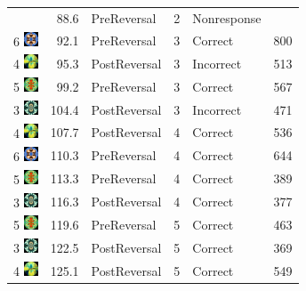 \documentclass[]{article}
\begin{document}
\begin{longtable}[]{@{}lrlrll@{}}
& 88.6 & PreReversal & 2 & Nonresponse &\tabularnewline
6
\includegraphics[width=0.16670in,height=0.16670in]{../ReversalLearning_20130621/images/abs6.jpg}
& 92.1 & PreReversal & 3 & Correct & 800\tabularnewline
4
\includegraphics[width=0.16670in,height=0.16670in]{../ReversalLearning_20130621/images/abs4.jpg}
& 95.3 & PostReversal & 3 & Incorrect & 513\tabularnewline
5
\includegraphics[width=0.16670in,height=0.16670in]{../ReversalLearning_20130621/images/abs5.jpg}
& 99.2 & PreReversal & 3 & Correct & 567\tabularnewline
3
\includegraphics[width=0.16670in,height=0.16670in]{../ReversalLearning_20130621/images/abs3.jpg}
& 104.4 & PostReversal & 3 & Incorrect & 471\tabularnewline
4
\includegraphics[width=0.16670in,height=0.16670in]{../ReversalLearning_20130621/images/abs4.jpg}
& 107.7 & PostReversal & 4 & Correct & 536\tabularnewline
6
\includegraphics[width=0.16670in,height=0.16670in]{../ReversalLearning_20130621/images/abs6.jpg}
& 110.3 & PreReversal & 4 & Correct & 644\tabularnewline
5
\includegraphics[width=0.16670in,height=0.16670in]{../ReversalLearning_20130621/images/abs5.jpg}
& 113.3 & PreReversal & 4 & Correct & 389\tabularnewline
3
\includegraphics[width=0.16670in,height=0.16670in]{../ReversalLearning_20130621/images/abs3.jpg}
& 116.3 & PostReversal & 4 & Correct & 377\tabularnewline
5
\includegraphics[width=0.16670in,height=0.16670in]{../ReversalLearning_20130621/images/abs5.jpg}
& 119.6 & PreReversal & 5 & Correct & 463\tabularnewline
3
\includegraphics[width=0.16670in,height=0.16670in]{../ReversalLearning_20130621/images/abs3.jpg}
& 122.5 & PostReversal & 5 & Correct & 369\tabularnewline
4
\includegraphics[width=0.16670in,height=0.16670in]{../ReversalLearning_20130621/images/abs4.jpg}
& 125.1 & PostReversal & 5 & Correct & 549\tabularnewline
\bottomrule
\end{longtable}
\end{document}
